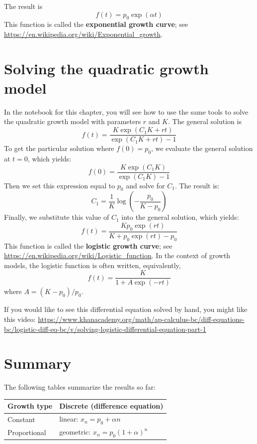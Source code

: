 \documentclass[12pt]{book}
\theoremstyle{exercise}
\begin{document}
The result is 
%
\[ f{\left (t \right )} = p_{0} \exp(\alpha t) \]
%
This function is called the {\bf exponential growth curve}; see \url{https://en.wikipedia.org/wiki/Exponential_growth}.


\section{Solving the quadratic growth model}

In the notebook for this chapter, you will see how to use the same tools to solve the quadratic growth model with parameters $r$ and $K$.  The general solution is
%
\[ f{\left (t \right )} = \frac{K \exp(C_{1} K + r t)}{\exp(C_{1} K + r t) - 1} \]
%
To get the particular solution where $f(0) = p_0$, we evaluate the general solution at $t=0$, which yields:
%
\[ f(0) = \frac{K \exp(C_{1} K)}{\exp(C_{1} K) - 1} \]
%
Then we set this expression equal to $p_0$ and solve for $C_1$.  The result is:
%
\[ C_1 = \frac{1}{K} \log{\left (- \frac{p_{0}}{K - p_{0}} \right )} \]
%
Finally, we substitute this value of $C_1$ into the general solution, which yields:
%
\[ f(t) = \frac{K p_{0} \exp(r t)}{K + p_{0} \exp(r t) - p_{0}} \]
%
This function is called the {\bf logistic growth curve}; see \url{https://en.wikipedia.org/wiki/Logistic_function}.  In the context of growth models, the logistic function is often written, equivalently,
%
\[ f(t) = \frac{K}{1 + A \exp(-rt)} \]
%
where $A = (K - p_0) / p_0$.

If you would like to see this differential equation solved by hand, you might like this video: \url{https://www.khanacademy.org/math/ap-calculus-bc/diff-equations-bc/logistic-diff-eq-bc/v/solving-logistic-differential-equation-part-1}


\section{Summary}

The following tables summarize the results so far:

\begin{tabular}{l|l} 
\hline
Growth type         & Discrete (difference equation) \\ 
\hline 
Constant & linear: $x_n = p_0 + \alpha n$  \\ 
 
Proportional & geometric: $x_n = p_0(1+\alpha)^n$  \\ 

\end{tabular} 
\end{document}
